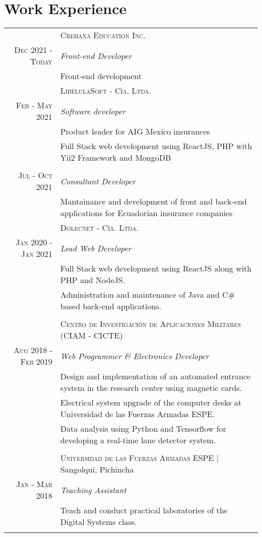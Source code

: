 \documentclass[a4paper,10.9pt]{article}
\begin{document}
\section{Work Experience}
\begin{tabular}{r|p{11cm}}
&\textsc{Crehana Education Inc.} \\
\textsc{Dec 2021 - Today}&\emph{Front-end Developer}\\
&\footnotesize{Front-end development}
\multicolumn{2}{c}{} \\ 
 &\textsc{LibélulaSoft - Cía. Ltda.} \\
\textsc{Feb - May 2021}&\emph{Software developer}\\
&\footnotesize{Product leader for AIG Mexico insurances}
\\
&\footnotesize{Full Stack web development using ReactJS, PHP with Yii2 Framework and MongoDB}\\
\\
\textsc{Jul - Oct 2021}&\emph{Consultant Developer}\\
&\footnotesize{Mantainance and development of front and back-end applications for Ecuadorian insurance companies}
\multicolumn{2}{c}{} \\ 
 &\textsc{Dolecnet - Cía. Ltda.} \\
\textsc{Jan 2020 - Jan 2021} &\emph{Lead Web Developer}\\&\footnotesize{Full Stack web development using ReactJS along with PHP and NodeJS.}
\\&\footnotesize{Administration and maintenance of Java and C\# based back-end applications.}\\
\multicolumn{2}{c}{} \\ 
&\textsc{Centro de Investigación de Aplicaciones Militares (CIAM - CICTE)} \\
\textsc{Aug 2018 - Feb 2019}&\emph{Web Programmer \& Electronics Developer}\\&\footnotesize{Design and implementation of an automated entrance system in the research center using magnetic cards.}\\&\footnotesize{Electrical system upgrade of the computer desks at Universidad de las Fuerzas Armadas ESPE.}\\&\footnotesize{Data analysis using Python and Tensorflow for developing a real-time lane detector system.}\\
\multicolumn{2}{c}{} \\ 
 &\textsc{Universidad de las Fuerzas Armadas ESPE} | Sangolquí, Pichincha \\
 \textsc{Jan - Mar 2018}&\emph{Teaching Assistant}\\&\footnotesize{Teach and conduct practical laboratories of the Digital Systems class.}\\
\\
\end{tabular}
\end{document}

